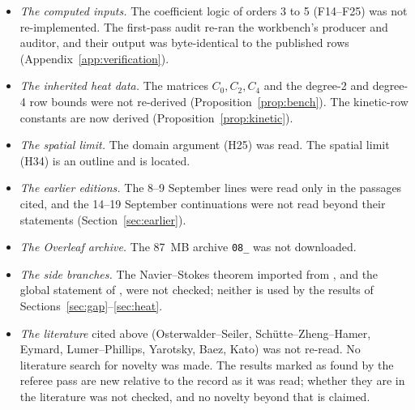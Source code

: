 \begin{itemize}
\item \emph{The computed inputs.} The coefficient logic of orders 3 to 5 (F14--F25) was not re-implemented. The first-pass audit re-ran the workbench's producer and auditor, and their output was byte-identical to the published rows (Appendix~\ref{app:verification}).
\item \emph{The inherited heat data.} The matrices $C_0,C_2,C_4$ and the degree-2 and degree-4 row bounds were not re-derived (Proposition~\ref{prop:bench}). The kinetic-row constants are now derived (Proposition~\ref{prop:kinetic}).
\item \emph{The spatial limit.} The domain argument (H25) was read. The spatial limit (H34) is an outline and is located.
\item \emph{The earlier editions.} The 8--9 September lines were read only in the passages cited, and the 14--19 September continuations were not read beyond their statements (Section~\ref{sec:earlier}).
\item \emph{The Overleaf archive.} The 87~MB archive \texttt{08\_} was not downloaded.
\item \emph{The side branches.} The Navier--Stokes theorem imported from \cite{OpenAINS}, and the global statement of \cite{AlpogeS6}, were not checked; neither is used by the results of Sections~\ref{sec:gap}--\ref{sec:heat}.
\item \emph{The literature} cited above (Osterwalder--Seiler, Schütte--Zheng--Hamer, Eymard, Lumer--Phillips, Yarotsky, Baez, Kato) was not re-read. No literature search for novelty was made. The results marked as found by the referee pass are new relative to the record as it was read; whether they are in the literature was not checked, and no novelty beyond that is claimed.
\end{itemize}
